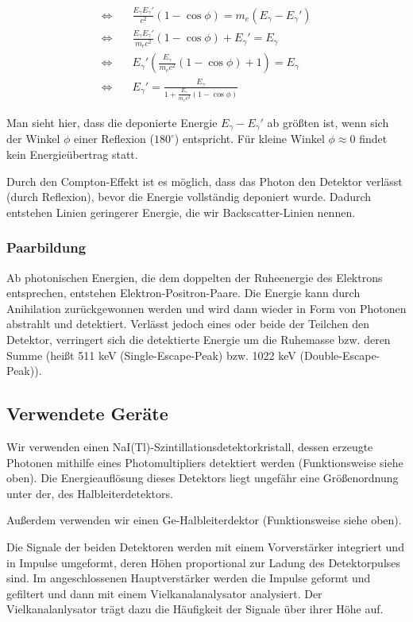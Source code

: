 \documentclass[a4paper,german,12pt,smallheadings]{scrartcl}
\begin{document}
\begin{align}
  \Leftrightarrow\quad&\frac{E_\gamma E_\gamma'}{c^2}(1 - \cos \phi) = m_e(E_\gamma - E_\gamma') \\
  \Leftrightarrow\quad&\frac{E_\gamma E_\gamma'}{m_e c^2}(1 - \cos \phi) + E_\gamma' = E_\gamma \\
  \Leftrightarrow\quad&E_\gamma' \left(\frac{E_\gamma}{m_e c^2}(1 - \cos \phi) + 1\right) = E_\gamma \\
  \Leftrightarrow\quad&E_\gamma' = \frac{E_\gamma}{1 + \frac{E_\gamma}{m_e c^2}(1 - \cos \phi)}
\end{align}

Man sieht hier, dass die deponierte Energie $E_\gamma - E_\gamma'$ ab größten
ist, wenn sich der Winkel $\phi$ einer Reflexion ($180^\circ$) entspricht. Für
kleine Winkel $\phi \approx 0$ findet kein Energieübertrag statt.

Durch den Compton-Effekt ist es möglich, dass das Photon den Detektor verlässt
(durch Reflexion), bevor die Energie vollständig deponiert wurde. Dadurch
entstehen Linien geringerer Energie, die wir Backscatter-Linien nennen.

\subsubsection{Paarbildung}

Ab photonischen Energien, die dem doppelten der Ruheenergie des Elektrons
entsprechen, entstehen Elektron-Positron-Paare. Die Energie kann durch
Anihilation zurückgewonnen werden und wird dann wieder in Form von Photonen
abstrahlt und detektiert. Verlässt jedoch eines oder beide der Teilchen den
Detektor, verringert sich die detektierte Energie um die Ruhemasse bzw. deren
Summe (heißt 511 keV (Single-Escape-Peak) bzw. 1022 keV (Double-Escape-Peak)).

\subsection{Verwendete Geräte}

Wir verwenden einen NaI(Tl)-Szintillationsdetektorkristall, dessen erzeugte
Photonen mithilfe eines Photomultipliers detektiert werden (Funktionsweise
siehe oben). Die Energieauflösung dieses Detektors liegt ungefähr eine
Größenordnung unter der, des Halbleiterdetektors.

Außerdem verwenden wir einen Ge-Halbleiterdektor (Funktionsweise siehe oben).

Die Signale der beiden Detektoren werden mit einem Vorverstärker integriert und
in Impulse umgeformt, deren Höhen proportional zur Ladung des Detektorpulses
sind. Im angeschlossenen Hauptverstärker werden die Impulse geformt und
gefiltert und dann mit einem Vielkanalanalysator analysiert. Der
Vielkanalanlysator trägt dazu die Häufigkeit der Signale über ihrer Höhe auf.
\end{document}
